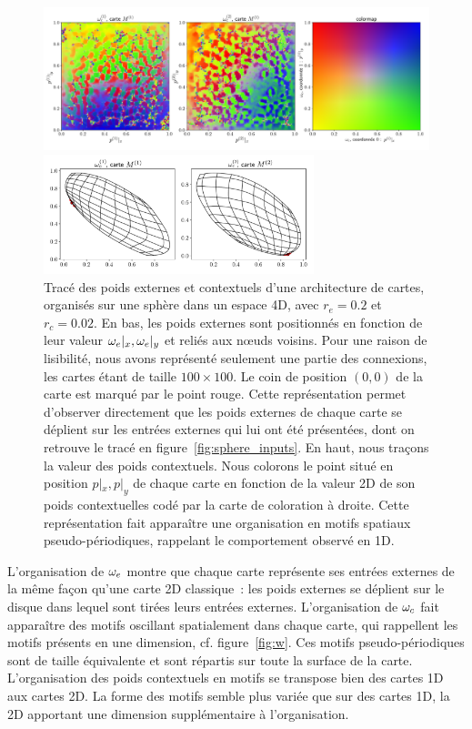 \documentclass[../main]{subfiles}
\begin{document}
\begin{figure}[h!]
	\begin{minipage}{\textwidth}
	\includegraphics[width=\textwidth]{wc_rc002_afterbug_nopoints.pdf}
	\end{minipage}
	\begin{minipage}{\textwidth}
		\includegraphics[width=0.7\textwidth]{we_rc002_afterbug_step10.pdf}
		\caption{Tracé des poids externes et contextuels d'une architecture de cartes, organisés sur une sphère dans un espace 4D, avec $r_e =0.2$ et $r_c = 0.02$.
		En bas, les poids externes sont positionnés en fonction de leur valeur $\omega_e|_x, \omega_e|_y$ et reliés aux n\oe{}uds voisins. Pour une raison de lisibilité, nous avons représenté seulement une partie des connexions, les cartes étant de taille $100 \times 100$. Le coin de position $(0,0)$ de la carte est marqué par le point rouge. Cette représentation permet d'observer directement que les poids externes de chaque carte se déplient sur les entrées externes qui lui ont été présentées, dont on retrouve le tracé en figure~\ref{fig:sphere_inputs}.
		En haut, nous traçons la valeur des poids contextuels. Nous colorons le point situé en position $p|_x, p|_y$ de chaque carte en fonction de la valeur 2D de son poids contextuelles codé par la carte de coloration à droite. Cette représentation fait apparaître une organisation en motifs spatiaux pseudo-périodiques, rappelant le comportement observé en 1D.
		\label{fig:2som_s_002_wc}}
		\end{minipage}
\end{figure}


L'organisation de $\omega_e$ montre que chaque carte représente ses entrées externes de la même façon qu'une carte 2D classique~: les poids externes se déplient sur le disque dans lequel sont tirées leurs entrées externes. 
L'organisation de $\omega_c$ fait apparaître des motifs oscillant spatialement dans chaque carte, qui rappellent les motifs présents en une dimension, cf. figure~\ref{fig:w}.
Ces motifs pseudo-périodiques sont de taille équivalente et sont répartis sur toute la surface de la carte. 
L'organisation des poids contextuels en motifs se transpose bien des cartes 1D aux cartes 2D. La forme des motifs semble plus variée que sur des cartes 1D, la 2D apportant une dimension supplémentaire à l'organisation.
\end{document}
